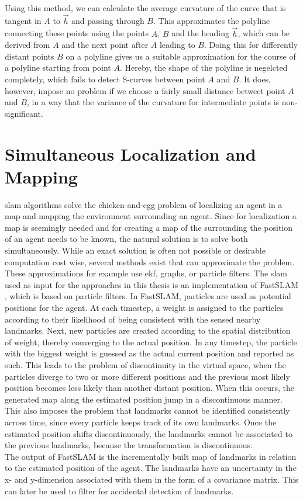 Using this method, we can calculate the average curvature of the curve that is tangent in $A$ to $\vec h$ and passing through $B$. This approximates the polyline connecting these points using the points $A$, $B$ and the heading  $\vec h$, which can be derived from $A$ and the next point after $A$ leading to $B$.
Doing this for differently distant points $B$ on a polyline gives us a suitable approximation for the course of a polyline starting from point $A$. Hereby, the shape of the polyline is negelcted completely, which fails to detect S-curves between point $A$ and $B$. It does, however, impose no problem if we choose a fairly small distance betweet point $A$ and $B$, in a way that the variance of the curvature for intermediate points is non-significant.

\section{Simultaneous Localization and Mapping}
\ac{slam} algorithms solve the chicken-and-egg problem of localizing an agent in a map and mapping the environment surrounding an agent. Since for localization a map is seemingly needed and for creating a map of the surrounding the position of an agent needs to be known, the natural solution is to solve both simultaneously. While an exact solution is often not possible  or desirable computation cost wise, several methods exist that can approximate the problem. These approximations for example use \ac{ekf}, graphs, or particle filters. The \ac{slam} used as input for the approaches in this thesis is an implementation of FastSLAM \cite{FastSLAM2002}, which is based on particle filters. In FastSLAM, particles are used as potential positions for the agent. At each timestep, a weight is assigned to the particles according to their likelihood of being consistent with the sensed nearby landmarks. Next, new particles are created according to the spatial distribution of weight, thereby converging to the actual position. In any timestep, the particle with the biggest weight is guessed as the actual current position and reported as such. This leads to the problem of  discontinuity in the virtual space, when the particles diverge to two or more different positions and the previous most likely position becomes less likely than another distant position. When this occurs, the generated map along the estimated position jump in a discontinuous manner. This also imposes the problem that landmarks cannot be identified consistently across time, since every particle keeps track of its own landmarks. Once the estimated position shifts discontinuously, the landmarks cannot be associated to the previous landmarks, because the transformation is discontinuous. \\The output of FastSLAM is the incrementally built map of landmarks in relation to the estimated position of the agent. The landmarks have an uncertainty in the x- and y-dimension associated with them in the form of a covariance matrix. This can later be used to filter for accidental detection of landmarks.

